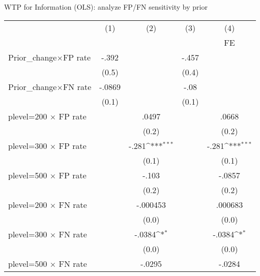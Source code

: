 \def\sym#1{\ifmmode^{#1}\else\(^{#1}\)\fi}
\caption{WTP for Information (OLS): analyze FP/FN sensitivity by prior}
\begin{tabular}{l*{4}{c}}
\hline\hline
                &\multicolumn{1}{c}{(1)}&\multicolumn{1}{c}{(2)}&\multicolumn{1}{c}{(3)}&\multicolumn{1}{c}{(4)}\\
                &\multicolumn{1}{c}{}&\multicolumn{1}{c}{}&\multicolumn{1}{c}{}&\multicolumn{1}{c}{FE}\\
\hline
Prior\_change$\times$FP rate&    -.392         &                  &    -.457         &                  \\
                &    (0.5)         &                  &    (0.4)         &                  \\
Prior\_change$\times$FN rate&   -.0869         &                  &     -.08         &                  \\
                &    (0.1)         &                  &    (0.1)         &                  \\
plevel=200 $\times$ FP rate&                  &    .0497         &                  &    .0668         \\
                &                  &    (0.2)         &                  &    (0.2)         \\
plevel=300 $\times$ FP rate&                  &    -.281\sym{***}&                  &    -.281\sym{***}\\
                &                  &    (0.1)         &                  &    (0.1)         \\
plevel=500 $\times$ FP rate&                  &    -.103         &                  &   -.0857         \\
                &                  &    (0.2)         &                  &    (0.2)         \\
plevel=200 $\times$ FN rate&                  & -.000453         &                  &  .000683         \\
                &                  &    (0.0)         &                  &    (0.0)         \\
plevel=300 $\times$ FN rate&                  &   -.0384\sym{*}  &                  &   -.0384\sym{*}  \\
                &                  &    (0.0)         &                  &    (0.0)         \\
plevel=500 $\times$ FN rate&                  &   -.0295         &                  &   -.0284         \\

\end{tabular}
